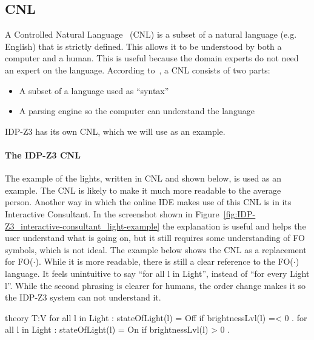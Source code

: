\documentclass[11pt,a4paper]{report}
\newcommand{\fodot}{FO($\cdot$)\xspace}
\begin{document}
\subsection{CNL}
\label{CNL}
A Controlled Natural Language~\cite{CNL} (CNL) is a subset of a natural language (e.g. English) that is strictly defined. This allows it to be understood by both a computer and a human. This is useful because the domain experts do not need an expert on the language. According to~\cite{CNLAttemptoControlledEnglish}, a CNL consists of two parts:
 \begin{itemize}
 	\item A subset of a language used as ``syntax'' 
     \item A parsing engine so the computer can understand the language
 \end{itemize}
 IDP-Z3 has its own CNL, which we will use as an example.

\paragraph{The IDP-Z3 CNL}
The example of the lights, written in CNL and shown below, is used as an example. The CNL is likely to make it much more readable to the average person. Another way in which the online IDE makes use of this CNL is in its Interactive Consultant. In the screenshot shown in Figure~\ref{fig:IDP-Z3_interactive-consultant_light-example} the explanation is useful and helps the user understand what is going on, but it still requires some understanding of FO symbols, which is not ideal.
The example below shows the CNL as a replacement for \fodot. While it is more readable, there is still a clear reference to the \fodot language. It feels unintuitive to say ``for all l in Light'', instead of ``for every Light l''. While the second phrasing is clearer for humans, the order change makes it so the IDP-Z3 system can not understand it.

\begin{idplisting}
theory T:V {
    {
        for all l in Light : stateOfLight(l) = Off if brightnessLvl(l) =< 0 .
        for all l in Light : stateOfLight(l) = On if brightnessLvl(l) > 0 .
    }
}
\end{idplisting}
\end{document}
